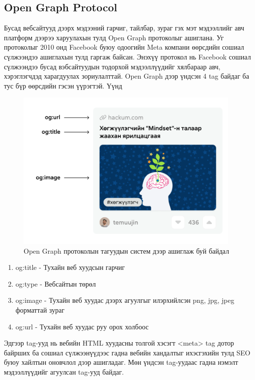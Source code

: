 \subsection{Open Graph Protocol}

Бусад вебсайтууд дээрх мэдээний гарчиг, тайлбар, зураг гэх мэт мэдээллийг авч платформ дээрээ харуулахын тулд Open Graph протоколыг ашиглана. Уг протоколыг 2010 онд Facebook буюу одоогийн Meta компани өөрсдийн сошиал сүлжээндээ ашиглахын тулд гаргаж байсан. Энэхүү протокол нь Facebook сошиал сүлжээндээ бусад вэбсайтуудын тодорхой мэдээллүүдийг хялбараар авч, хэрэглэгчдэд харагдуулах зориулалттай. Open Graph дээр үндсэн 4 tag байдаг ба тус бүр өөрсдийн гэсэн үүрэгтэй. Үүнд

\begin{figure}[h]
	\centering
	\includegraphics[width=11cm]{images/ogprotocol.png}
	\caption{Open Graph протоколын тагуудын систем дээр ашиглаж буй байдал}
	\label{fig:open-graph-protocol}
\end{figure}

\begin{enumerate}
	\item og:title - Тухайн веб хуудсын гарчиг
	\item og:type - Вебсайтын төрөл
	\item og:image - Тухайн веб хуудас дээрх агуулгыг илэрхийлсэн png, jpg, jpeg форматтай зураг
	\item og:url - Тухайн веб хуудас руу орох холбоос
\end{enumerate} 

Эдгээр tag-ууд нь вебийн HTML хуудасны толгой хэсэгт <meta> tag дотор байрших ба сошиал сүлжээнүүдээс гадна вебийн хандалтыг ихэсгэхийн тулд SEO буюу хайлтын оновчлол дээр ашигладаг. Мөн үндсэн tag-уудаас гадна нэмэлт мэдээллүүдийг агуулсан tag-ууд байдаг.

